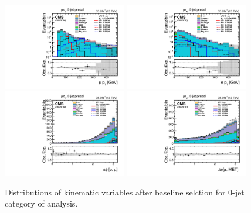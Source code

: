 \begin{figure}[htbp]
     \centering
     \includegraphics[width=0.48\textwidth]{plots_and_figures/chapter5/preselection_HM/log_mutaue_0jet_presel_mPt.pdf}
     \includegraphics[width=0.48\textwidth]{plots_and_figures/chapter5/preselection_HM/log_mutaue_0jet_presel_ePt.pdf}\\
     \includegraphics[width=0.48\textwidth]{plots_and_figures/chapter5/preselection_HM/mutaue_0jet_presel_dphiemu.pdf}
     \includegraphics[width=0.48\textwidth]{plots_and_figures/chapter5/preselection_HM/mutaue_0jet_presel_dphiMuMet.pdf}\\
     \caption{Distributions of kinematic variables after baseline selction for 0-jet category of \Hmue analysis.}
     \label{fig:Hmutaue_presel1}
\end{figure}

